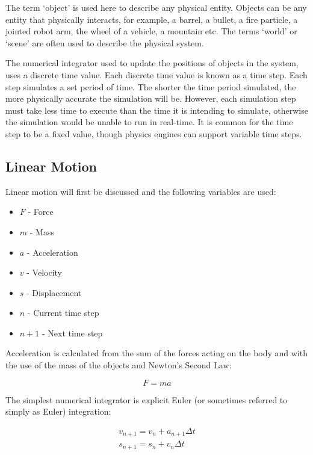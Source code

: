 The term `object' is used here to describe any physical entity. Objects can be any entity that physically interacts, for example, a barrel, a bullet, a fire particle, a jointed robot arm, the wheel of a vehicle, a mountain etc. The terms `world' or `scene' are often used to describe the physical system.

The numerical integrator used to update the positions of objects in the system, uses a discrete time value. Each discrete time value is known as a time step. Each step simulates a set period of time. The shorter the time period simulated, the more physically accurate the simulation will be. However, each simulation step must take less time to execute than the time it is intending to simulate, otherwise the simulation would be unable to run in real-time. It is common for the time step to be a fixed value, though physics engines can support variable time steps.

\subsection{Linear Motion}
Linear motion will first be discussed and the following variables are used:
\begin{itemize}
	\item $F$ - Force
	\item $m$ - Mass
	\item $a$ - Acceleration
	\item $v$ - Velocity
	\item $s$ - Displacement
	\item $n$ - Current time step
	\item $n+1$ - Next time step
\end{itemize}

Acceleration is calculated from the sum of the forces acting on the body and with the use of the mass of the objects and Newton's Second Law:

\begin{equation}
F=ma
\end{equation}

The simplest numerical integrator is explicit Euler (or sometimes referred to simply as Euler) integration:

\begin{equation}
\begin{split}
	v_{n+1}=v_n+a_{n+1}{\Delta}t\\
	s_{n+1}=s_n+v_{n}{\Delta}t
\end{split}
\end{equation}

